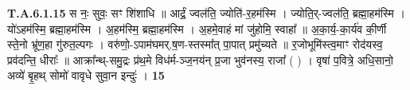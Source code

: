 \documentclass[17pt]{extarticle}
\begin{document}
                  \newline
                                                                  \textbf{ T.A.6.1.15} \newline
                  स नः॒ सुवः॒ सꣳ शि॑शाधि ॥  आर्द्रं॒ ज्वल॑ति॒ ज्योति॑-र॒हम॑स्मि । ज्योति॒र्-ज्वल॑ति॒ ब्रह्मा॒हम॑स्मि । यो॑ऽहम॑स्मि॒ ब्रह्मा॒हम॑स्मि । अ॒हम॑स्मि॒ ब्रह्मा॒हम॑स्मि । अ॒हमे॒वाहं मां जु॑होमि॒ स्वाहा᳚ ॥ अ॒का॒र्य॒-का॒र्य॑व की॒र्णी स्ते॒नो भ्रू॑ण॒हा गु॑रुत॒ल्पगः । वरु॑णो॒-ऽपाम॑घमर्.ष॒ण-स्तस्मा᳚त् पा॒पात् प्रमु॑च्यते ॥  र॒जोभूमि॑स्त्व॒माꣳ रोद॑यस्व॒ प्रव॑दन्ति॒ धीराः᳚ ॥  आक्रा᳚न्थ्-समु॒द्रः प्र॑थ॒मे विध॑र्म-ञ्ज॒नय॑न् प्र॒जा भुव॑नस्य॒ राजा᳚ ( ) ।  वृषा॑ प॒वित्रे॒ अधि॒सानो॒ अव्ये॑ बृ॒हथ् सोमो॑  वावृधे सुवा॒न इन्दुः॑ । \textbf{ 15} \newline
                  \newline
                                                  
\end{document}

